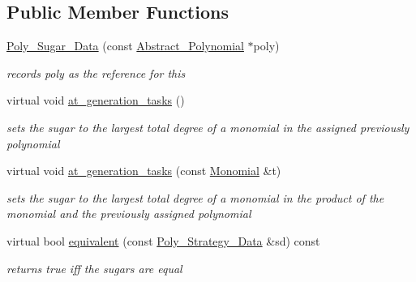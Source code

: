 \subsection*{Public Member Functions}
\begin{DoxyCompactItemize}
\item 
\mbox{\label{class_poly___sugar___data_a0d9e2f66a44f2e10d26b977c55650f7f}} 
\hyperlink{class_poly___sugar___data_a0d9e2f66a44f2e10d26b977c55650f7f}{Poly\+\_\+\+Sugar\+\_\+\+Data} (const \hyperlink{class_abstract___polynomial}{Abstract\+\_\+\+Polynomial} $\ast$poly)
\begin{DoxyCompactList}\small\item\em records {\ttfamily poly} as the reference for {\ttfamily this} \end{DoxyCompactList}\item 
\mbox{\label{class_poly___sugar___data_ada533e5c56d7f53207a5e8093414dfb3}} 
virtual void \hyperlink{class_poly___sugar___data_ada533e5c56d7f53207a5e8093414dfb3}{at\+\_\+generation\+\_\+tasks} ()
\begin{DoxyCompactList}\small\item\em sets the sugar to the largest total degree of a monomial in the assigned previously polynomial \end{DoxyCompactList}\item 
\mbox{\label{class_poly___sugar___data_aa80c660f10b1c5d0dd2a305d598685f5}} 
virtual void \hyperlink{class_poly___sugar___data_aa80c660f10b1c5d0dd2a305d598685f5}{at\+\_\+generation\+\_\+tasks} (const \hyperlink{class_monomial}{Monomial} \&t)
\begin{DoxyCompactList}\small\item\em sets the sugar to the largest total degree of a monomial in the product of the monomial and the previously assigned polynomial \end{DoxyCompactList}\item 
\mbox{\label{class_poly___sugar___data_a73df53a8da9e4cfaf66202a1451d5b2e}} 
virtual bool \hyperlink{class_poly___sugar___data_a73df53a8da9e4cfaf66202a1451d5b2e}{equivalent} (const \hyperlink{class_poly___strategy___data}{Poly\+\_\+\+Strategy\+\_\+\+Data} \&sd) const
\begin{DoxyCompactList}\small\item\em returns {\ttfamily true} iff the sugars are equal \end{DoxyCompactList}\item 

\end{DoxyCompactItemize}

